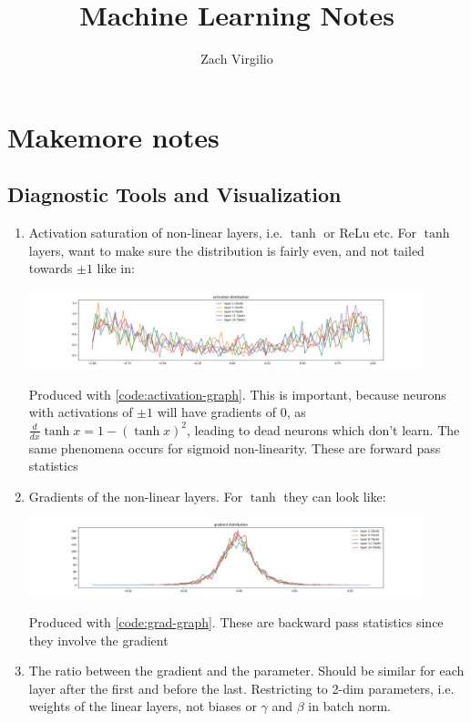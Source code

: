 \documentclass{article}
\begin{document}
\title{Machine Learning Notes}
\author{Zach Virgilio}
\maketitle 

\section*{Makemore notes}
\subsection*{Diagnostic Tools and Visualization}
    \begin{enumerate}
        \item Activation saturation of non-linear layers, i.e. $\tanh$ or ReLu etc.  For $\tanh$ layers, want to make sure the distribution is fairly even, and not tailed towards $\pm 1$ like in:

        \includegraphics[width=0.9\textwidth]{images/tanh-activation}        

        Produced with \ref{code:activation-graph}.  
        This is important, because neurons with activations of $\pm 1$ will have gradients of $0$, as $\frac{d}{dx}\tanh x = 1 - (\tanh x)^2$, leading to dead neurons which don't learn. 
        The same phenomena occurs for sigmoid non-linearity.
        These are forward pass statistics

        \item Gradients of the non-linear layers.  For $\tanh$ they can look like:

        \includegraphics[width=0.9\textwidth]{images/dsitribution of gradients.png}

        Produced with \ref{code:grad-graph}.  These are backward pass statistics since they involve the gradient

        \item The ratio between the gradient and the parameter.  
        Should be similar for each layer after the first and before the last.  
        Restricting to 2-dim parameters, i.e. weights of the linear layers, not biases or $\gamma$ and $\beta$ in batch norm.


\end{enumerate}
\end{document}
